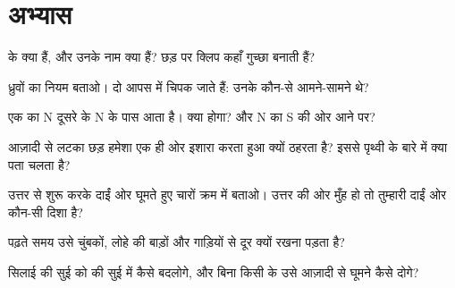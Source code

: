 \section{अभ्यास}

\begin{exercise}[$\star$]\label{exo:g4:magnets-and-compass:1}
 के  क्या हैं, और उनके नाम क्या हैं? छड़  पर क्लिप
कहाँ गुच्छा बनाती हैं?
\end{exercise}

\begin{exercise}[$\star$]\label{exo:g4:magnets-and-compass:2}
ध्रुवों का नियम बताओ। दो  आपस में चिपक जाते हैं: उनके कौन-से
 आमने-सामने थे?
\end{exercise}

\begin{exercise}[$\star$]\label{exo:g4:magnets-and-compass:3}
एक  का N  दूसरे  के N  के पास आता है। क्या होगा?
और N का S की ओर आने पर?
\end{exercise}

\begin{exercise}[$\star$]\label{exo:g4:magnets-and-compass:4}
आज़ादी से लटका छड़  हमेशा एक ही ओर इशारा करता हुआ क्यों ठहरता
है? इससे पृथ्वी के बारे में क्या पता चलता है?
\end{exercise}

\begin{exercise}[$\star$]\label{exo:g4:magnets-and-compass:5}
उत्तर से शुरू करके दाईं ओर घूमते हुए चारों  क्रम में
बताओ। उत्तर की ओर मुँह हो तो तुम्हारी दाईं ओर कौन-सी दिशा है?
\end{exercise}

\begin{exercise}[$\star$]\label{exo:g4:magnets-and-compass:6}
 पढ़ते समय उसे चुंबकों, लोहे की बाड़ों और गाड़ियों से दूर
क्यों रखना पड़ता है?
\end{exercise}

\begin{exercise}[$\star$]\label{exo:g4:magnets-and-compass:7}
सिलाई की सुई को  की सुई में कैसे बदलोगे, और बिना किसी  के
उसे आज़ादी से घूमने कैसे दोगे?
\end{exercise}

